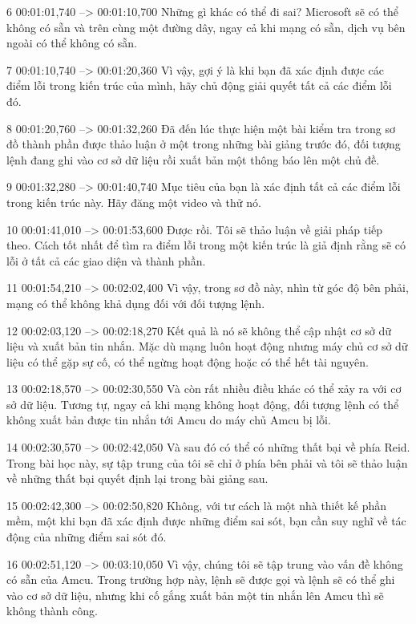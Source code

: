 6
00:01:01,740 --> 00:01:10,700
Những gì khác có thể đi sai?  Microsoft sẽ có thể không có sẵn và trên cùng một đường dây, ngay cả khi mạng có sẵn, dịch vụ bên ngoài có thể không có sẵn.

7
00:01:10,740 --> 00:01:20,360
Vì vậy, gợi ý là khi bạn đã xác định được các điểm lỗi trong kiến ​​trúc của mình, hãy chủ động giải quyết tất cả các điểm lỗi đó.

8
00:01:20,760 --> 00:01:32,260
Đã đến lúc thực hiện một bài kiểm tra trong sơ đồ thành phần được thảo luận ở một trong những bài giảng trước đó, đối tượng lệnh đang ghi vào cơ sở dữ liệu rồi xuất bản một thông báo lên một chủ đề.

9
00:01:32,280 --> 00:01:40,740
Mục tiêu của bạn là xác định tất cả các điểm lỗi trong kiến ​​trúc này.  Hãy đăng một video và thử nó.

10
00:01:41,010 --> 00:01:53,600
Được rồi.  Tôi sẽ thảo luận về giải pháp tiếp theo.  Cách tốt nhất để tìm ra điểm lỗi trong một kiến ​​trúc là giả định rằng sẽ có lỗi ở tất cả các giao diện và thành phần.

11
00:01:54,210 --> 00:02:02,400
Vì vậy, trong sơ đồ này, nhìn từ góc độ bên phải, mạng có thể không khả dụng đối với đối tượng lệnh.

12
00:02:03,120 --> 00:02:18,270
Kết quả là nó sẽ không thể cập nhật cơ sở dữ liệu và xuất bản tin nhắn.  Mặc dù mạng luôn hoạt động nhưng máy chủ cơ sở dữ liệu có thể gặp sự cố, có thể ngừng hoạt động hoặc có thể hết tài nguyên.

13
00:02:18,570 --> 00:02:30,550
Và còn rất nhiều điều khác có thể xảy ra với cơ sở dữ liệu.  Tương tự, ngay cả khi mạng không hoạt động, đối tượng lệnh có thể không xuất bản được tin nhắn tới Amcu do máy chủ Amcu bị lỗi.

14
00:02:30,570 --> 00:02:42,050
Và sau đó có thể có những thất bại về phía Reid.  Trong bài học này, sự tập trung của tôi sẽ chỉ ở phía bên phải và tôi sẽ thảo luận về những thất bại quyết định lại trong bài giảng sau.

15
00:02:42,300 --> 00:02:50,820
Không, với tư cách là một nhà thiết kế phần mềm, một khi bạn đã xác định được những điểm sai sót, bạn cần suy nghĩ về tác động của những điểm sai sót đó.

16
00:02:51,120 --> 00:03:10,050
Vì vậy, chúng tôi sẽ tập trung vào vấn đề không có sẵn của Amcu.  Trong trường hợp này, lệnh sẽ được gọi và lệnh sẽ có thể ghi vào cơ sở dữ liệu, nhưng khi cố gắng xuất bản một tin nhắn lên Amcu thì sẽ không thành công.

